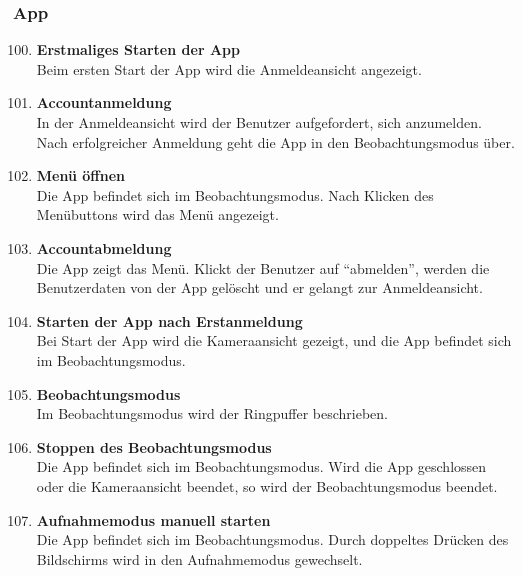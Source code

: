 \subsubsection{\gls{App}}
\begin{enumerate}[\bfseries{TK}10]  
\setcounter{enumi}{99}{}

\item \textbf{Erstmaliges Starten der \gls{App}} \hfill\\  
Beim ersten Start der App wird die Anmeldeansicht angezeigt.

\item \textbf{Accountanmeldung} \hfill\\  
In der Anmeldeansicht wird der Benutzer aufgefordert, sich anzumelden. Nach erfolgreicher Anmeldung geht die \gls{App} in den Beobachtungsmodus \"uber.

\item \textbf{Men\"u \"offnen} \hfill\\
Die \gls{App} befindet sich im Beobachtungsmodus. Nach Klicken des Men\"ubuttons wird das Men\"u angezeigt.

\item \textbf{Accountabmeldung} \hfill\\  
Die App zeigt das Men\"u. Klickt der Benutzer auf ``abmelden'', werden die Benutzerdaten von der App gelöscht und er gelangt zur Anmeldeansicht.

\item \textbf{Starten der \gls{App} nach Erstanmeldung} \hfill\\  
Bei Start der App wird die Kameraansicht gezeigt, und die App befindet sich im Beobachtungsmodus. %

\item \textbf{Beobachtungsmodus} \hfill\\
Im Beobachtungsmodus wird der \gls{Ringpuffer} beschrieben.

\item \textbf{Stoppen des Beobachtungsmodus} \hfill\\  
Die \gls{App} befindet sich im Beobachtungsmodus. Wird die App geschlossen oder die Kameraansicht beendet, so wird der Beobachtungsmodus beendet.

\item \textbf{Aufnahmemodus manuell starten} \hfill\\
Die \gls{App} befindet sich im Beobachtungsmodus. Durch doppeltes Dr\"ucken des Bildschirms wird in den Aufnahmemodus gewechselt. 


\end{enumerate}
